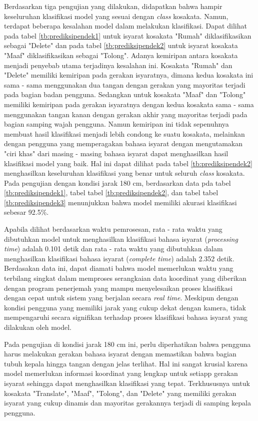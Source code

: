 Berdasarkan tiga pengujian yang dilakukan, didapatkan bahwa hampir keseluruhan klasifikasi model yang sesuai dengan \emph{class} kosakata. Namun, terdapat beberapa kesalahan model dalam melakukan klasifikasi. Dapat dilihat pada tabel \ref{tb:prediksipendek1} untuk isyarat kosakata "Rumah" diklasifikasikan sebagai "Delete" dan pada tabel \ref{tb:prediksipendek2} untuk isyarat kosakata "Maaf" diklasifikasikan sebagai "Tolong". Adanya kemiripan antara kosakata menjadi penyebab utama terjadinya kesalahan ini. Kosakata "Rumah" dan "Delete" memiliki kemiripan pada gerakan isyaratnya, dimana kedua kosakata ini sama - sama menggunakan dua tangan dengan gerakan yang mayoritas terjadi pada bagian badan pengguna. Sedangkan untuk kosakata "Maaf" dan "Tolong" memiliki kemiripan pada gerakan isyaratnya dengan kedua kosakata sama - sama menggunakan tangan kanan dengan gerakan akhir yang mayoritas terjadi pada bagian samping wajah pengguna. Namun kemiripan ini tidak sepenuhnya membuat hasil klasifikasi menjadi lebih condong ke suatu kosakata, melainkan dengan pengguna yang memperagakan bahasa isyarat dengan mengutamakan "ciri khas" dari masing - masing bahasa isyarat dapat menghasilkan hasil klasifikasi model yang baik. Hal ini dapat dilihat pada tabel \ref{tb:prediksipendek2} menghasilkan keseluruhan klasifikasi yang benar untuk seluruh \emph{class} kosakata. Pada pengujian dengan kondisi jarak 180 cm, berdasarkan data pda tabel \ref{tb:prediksipendek1}, tabel tabel \ref{tb:prediksipendek2}, dan tabel tabel \ref{tb:prediksipendek3} menunjukkan bahwa model memiliki akurasi klasifikasi sebesar 92.5\%.

Apabila dilihat berdasarkan waktu pemrosesan, rata - rata waktu yang dibutuhkan model untuk menghasilkan klasifikasi bahasa isyarat (\emph{processing time}) adalah 0.101 detik dan rata - rata waktu yang dibutuhkan dalam menghasilkan klasifikasi bahasa isyarat (\emph{complete time}) adalah 2.352 detik. Berdasakan data ini, dapat diamati bahwa model memerlukan waktu yang terbilang singkat dalam memproses serangkaian data koordinat yang diberikan dengan program penerjemah yang mampu menyelesaikan proses klasifikasi dengan cepat untuk sistem yang berjalan secara \emph{real time}. Meskipun dengan kondisi pengguna yang memiliki jarak yang cukup dekat dengan kamera, tidak mempengaruhi secara signifikan terhadap proses klasifikasi bahasa isyarat yang dilakukan oleh model.

Pada pengujian di kondisi jarak 180 cm ini, perlu diperhatikan bahwa pengguna harus melakukan gerakan bahasa isyarat dengan memastikan bahwa bagian tubuh kepala hingga tangan dengan jelas terlihat. Hal ini sangat krusial karena model memerlukan informasi koordinat yang lengkap untuk setiapp gerakan isyarat sehingga dapat menghasilkan klasifikasi yang tepat. Terkhususnya untuk kosakata "Translate", "Maaf", "Tolong", dan "Delete" yang memiliki gerakan isyarat yang cukup dinamis dan mayoritas gerakannya terjadi di samping kepala pengguna.  

